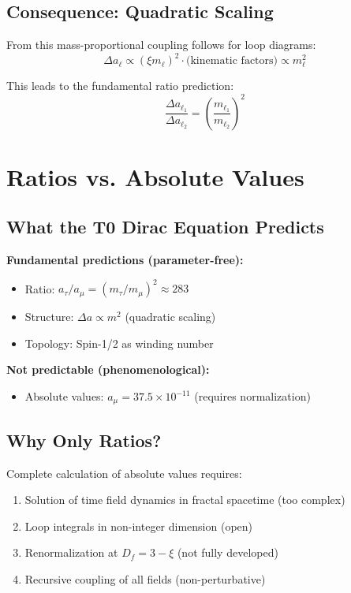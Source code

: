 	\subsection{Consequence: Quadratic Scaling}
	
	From this mass-proportional coupling follows for loop diagrams:
	\begin{equation}
		\Delta a_\ell \propto (\xi m_\ell)^2 \cdot \text{(kinematic factors)} \propto m_\ell^2
		\label{eq:quadratic_scaling}
	\end{equation}
	
	This leads to the fundamental ratio prediction:
	\begin{equation}
		\boxed{\frac{\Delta a_{\ell_1}}{\Delta a_{\ell_2}} = \left(\frac{m_{\ell_1}}{m_{\ell_2}}\right)^2}
		\label{eq:ratio_prediction}
	\end{equation}
	
	\section{Ratios vs. Absolute Values}
	
	\subsection{What the T0 Dirac Equation Predicts}
	
	\textbf{Fundamental predictions (parameter-free):}
	\begin{itemize}
		\item Ratio: $a_\tau/a_\mu = (m_\tau/m_\mu)^2 \approx 283$
		\item Structure: $\Delta a \propto m^2$ (quadratic scaling)
		\item Topology: Spin-1/2 as winding number
	\end{itemize}
	
	\textbf{Not predictable (phenomenological):}
	\begin{itemize}
		\item Absolute values: $a_\mu = 37.5 \times 10^{-11}$ (requires normalization)
	\end{itemize}
	
	\subsection{Why Only Ratios?}
	
	Complete calculation of absolute values requires:
	\begin{enumerate}
		\item Solution of time field dynamics in fractal spacetime (too complex)
		\item Loop integrals in non-integer dimension (open)
		\item Renormalization at $D_f = 3 - \xi$ (not fully developed)
		\item Recursive coupling of all fields (non-perturbative)
	\end{enumerate}
	
